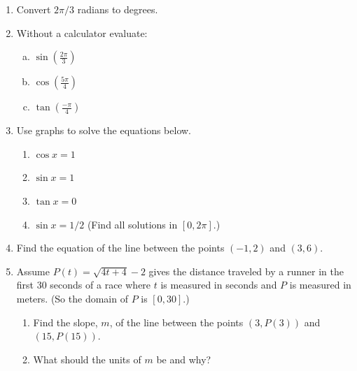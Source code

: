 \documentclass[11pt,fleqn]{article}
\begin{document}
\begin{enumerate}
\vfill
\item Convert $2\pi/3$ radians to degrees.
\vspace{.5in}
\item Without a calculator evaluate:
  \begin{multicols}{3}{
      \vspace*{-0.45in}
      \begin{enumerate}[(a)]
      \item $\sin (\frac{2 \pi}{3} )$
      \item $\cos( \frac{5 \pi}{4} )$
      \item $\tan(\frac{- \pi}4 )$
      \end{enumerate}}
  \end{multicols}
\item Use graphs to solve the equations below.
\begin{multicols}{2}
\begin{enumerate}
\item $\cos x =1$
\vspace{.5in}
\item $\sin x =1$
\vspace{1in}
\columnbreak
\item $\tan x = 0$
\vspace{1in}
\item $\sin x = 1/2$ (Find all solutions in $[0,2\pi].$)
\vspace{.5in}
\end{enumerate}
\end{multicols}
\vfill
\newpage
\item Find the equation of the line between the points $(-1,2)$ and $(3,6).$
\vfill
\item Assume $P(t)=\sqrt{4t+4}-2$ gives the distance traveled by a runner in the first 30 seconds of a race where  $t$ is measured in seconds and $P$ is measured in meters. (So the domain of $P$ is $[0,30].$)
\begin{enumerate}
\item Find the slope, $m$, of the line between the points $(3,P(3))$ and $(15,P(15)).$
\vfill
\item What should the units of $m$ be and why?
\vfill
\end{enumerate}
\end{enumerate}
\end{document}
